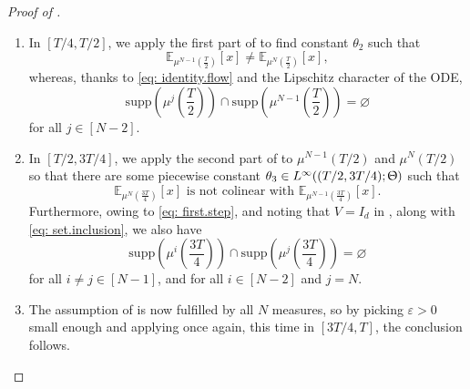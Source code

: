\documentclass[a4paper,11pt]{article}
\theoremstyle{plain}
\newcommand{\supp}{\mathrm{supp}}
\newcommand{\bV}{\bm{\mathit{V}}}
\numberwithin{equation}{section}
\begin{document}
\begin{proof}[Proof of ]
\begin{enumerate}
\begin{align}
    \supp\left(\mu^j\left(\frac{T}{4}\right)\right)\cap \supp\left(\mu^N\left(\frac{T}{4}\right)\right)=\varnothing\label{eq: first.step}\\
    \supp\left(\mu^j\left(\frac{T}{4}\right)\right)\cap \supp\left(\mu^{N-1}\left(\frac{T}{4}\right)\right)=\varnothing\nonumber
\end{align}
  for all $j\in[N-2]$.
\item In $\left[T/4,T/2\right]$, we apply the first part of  to find constant $\theta_2$ such that 
\begin{equation*}
    \mathbb{E}_{\mu^{N-1}\left(\frac{T}{2}\right)}[x]\neq \mathbb{E}_{\mu^{N}\left(\frac{T}{2}\right)}[x],
\end{equation*}
whereas, thanks to \eqref{eq: identity.flow} and the Lipschitz character of the ODE,
\begin{equation*}
    \supp\left(\mu^j\left(\frac{T}{2}\right)\right)\cap \supp\left(\mu^{N-1}\left(\frac{T}{2}\right)\right)=\varnothing
\end{equation*}
for all $j\in[N-2]$.
\item 
In $[T/2,3T/4]$, we apply the second part of  to $\mu^{N-1}\left(T/2\right)$ and $\mu^{N}\left(T/2\right)$ so that there are some piecewise constant $\theta_3\in L^\infty((T/2,3T/4);\Uptheta)$ such that 
\begin{equation*}
    \mathbb{E}_{\mu^N\left(\frac{3T}{4}\right)}[x] \text{ is not colinear with } \mathbb{E}_{\mu^{N-1}\left(\frac{3T}{4}\right)}[x].
\end{equation*}
Furthermore, owing to \eqref{eq: first.step}, and noting that $\bV=I_d$ in , along with \eqref{eq: set.inclusion}, we also have  
\begin{equation*}
    \supp\left(\mu^i\left(\frac{3T}{4}\right)\right)\cap\supp\left(\mu^j\left(\frac{3T}{4}\right)\right)=\varnothing
\end{equation*}
for all $i\neq j\in[N-1]$, and for all $i\in[N-2]$ and $j=N$. 
\item The assumption of  is now fulfilled by all $N$ measures, so by picking $\varepsilon>0$ small enough and applying  once again, this time in $\left[3T/4,T\right]$, the conclusion follows.\qedhere
\end{enumerate}
\end{proof}
\end{document}
